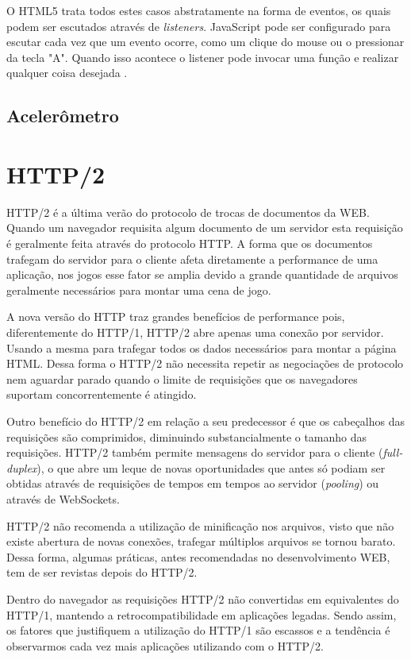 O HTML5 trata todos estes casos abstratamente na forma de eventos, os
quais podem ser escutados através de \textit{listeners}. JavaScript
pode ser configurado para escutar cada vez que um evento ocorre, como
um clique do mouse ou o pressionar da tecla "A". Quando isso acontece o
listener pode invocar uma função e realizar qualquer coisa desejada
\autocite{buildingHtml5Game}.

\subsection{Acelerômetro}
\begin{draft}
\end{draft}
\section{HTTP/2}
HTTP/2 é a última verão do protocolo de trocas de documentos da
WEB. Quando um navegador requisita algum documento de um servidor esta
requisição é geralmente feita através do protocolo HTTP. A forma
que os documentos trafegam do servidor para o cliente afeta diretamente
a performance de uma aplicação, nos jogos esse fator se amplia devido
a grande quantidade de arquivos geralmente necessários para montar uma
cena de jogo.

A nova versão do HTTP traz grandes benefícios de performance
pois, diferentemente do HTTP/1, HTTP/2 abre apenas uma conexão por
servidor. Usando a mesma para trafegar todos os dados necessários para
montar a página HTML. Dessa forma o HTTP/2 não necessita repetir
as negociações de protocolo nem aguardar parado quando o limite de
requisições que os navegadores suportam concorrentemente é atingido.

Outro benefício do HTTP/2 em relação a seu predecessor é que
os cabeçalhos das requisições são comprimidos, diminuindo
substancialmente o tamanho das requisições. HTTP/2 também permite
mensagens do servidor para o cliente (\textit{full-duplex}), o
que abre um leque de novas oportunidades que antes só podiam ser
obtidas através de requisições de tempos em tempos ao servidor
(\textit{pooling}) ou através de WebSockets.

HTTP/2 não recomenda a utilização de minificação nos arquivos,
visto que não existe abertura de novas conexões, trafegar múltiplos
arquivos se tornou barato. Dessa forma, algumas práticas, antes
recomendadas no desenvolvimento WEB, tem de ser revistas depois do
HTTP/2.

Dentro do navegador as requisições HTTP/2 não convertidas em
equivalentes do HTTP/1, mantendo a retrocompatibilidade em aplicações
legadas. Sendo assim, os fatores que justifiquem a utilização do HTTP/1
são escassos e a tendência é observarmos cada vez mais aplicações
utilizando com o HTTP/2.

